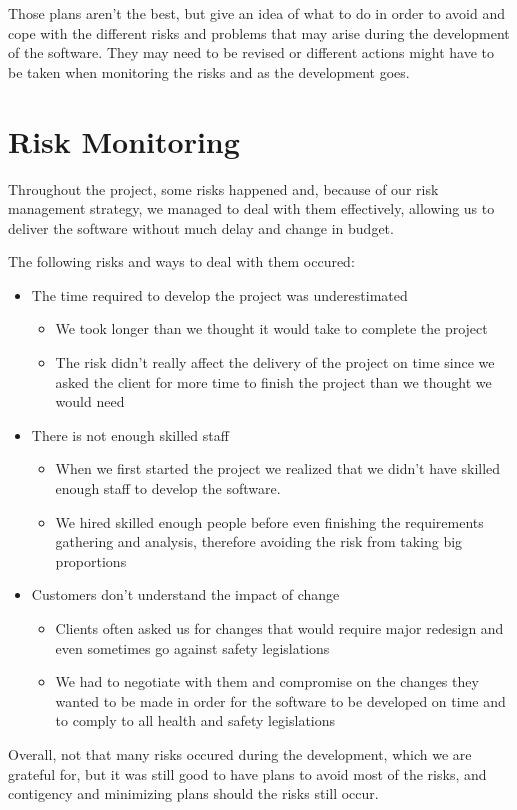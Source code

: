 Those plans aren't the best, but give an idea of what to do in order to avoid and cope with the different risks and problems that may arise during the development of the software. They may need to be revised or different actions might have to be taken when monitoring the risks and as the development goes.

\section{Risk Monitoring}
Throughout the project, some risks happened and, because of our risk management strategy, we managed to deal with them effectively, allowing us to deliver the software without much delay and change in budget.

The following risks and ways to deal with them occured:
\begin{itemize}
    \item The time required to develop the project was underestimated
    \begin{itemize}
        \item We took longer than we thought it would take to complete the project
        \item The risk didn't really affect the delivery of the project on time since we asked the client for more time to finish the project than we thought we would need
    \end{itemize}
    \item There is not enough skilled staff
    \begin{itemize}
        \item When we first started the project we realized that we didn't have skilled enough staff to develop the software.
        \item We hired skilled enough people before even finishing the requirements gathering and analysis, therefore avoiding the risk from taking big proportions
    \end{itemize}
    \item Customers don't understand the impact of change
    \begin{itemize}
        \item Clients often asked us for changes that would require major redesign and even sometimes go against safety legislations
        \item We had to negotiate with them and compromise on the changes they wanted to be made in order for the software to be developed on time and to comply to all health and safety legislations
    \end{itemize}
\end{itemize}

Overall, not that many risks occured during the development, which we are grateful for, but it was still good to have plans to avoid most of the risks, and contigency and minimizing plans should the risks still occur.